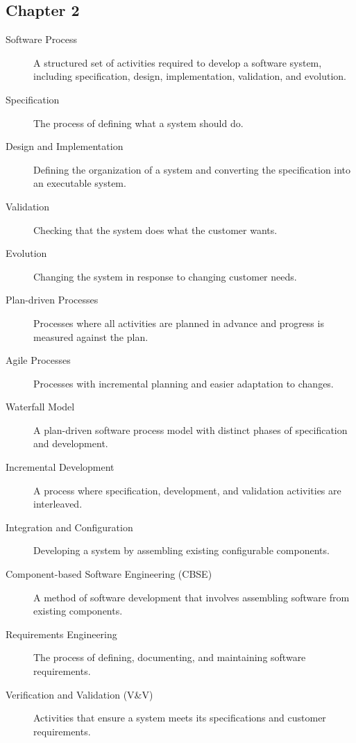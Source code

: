 \documentclass{article}
\begin{document}
\subsection{Chapter 2 }
\begin{description}
  \item[Software Process] A structured set of activities required to develop a software system, including specification, design, implementation, validation, and evolution.
  
  \item[Specification] The process of defining what a system should do.
  
  \item[Design and Implementation] Defining the organization of a system and converting the specification into an executable system.
  
  \item[Validation] Checking that the system does what the customer wants.
  
  \item[Evolution] Changing the system in response to changing customer needs.
  
  \item[Plan-driven Processes] Processes where all activities are planned in advance and progress is measured against the plan.
  
  \item[Agile Processes] Processes with incremental planning and easier adaptation to changes.
  
  \item[Waterfall Model] A plan-driven software process model with distinct phases of specification and development.
  
  \item[Incremental Development] A process where specification, development, and validation activities are interleaved.
  
  \item[Integration and Configuration] Developing a system by assembling existing configurable components.
  
  \item[Component-based Software Engineering (CBSE)] A method of software development that involves assembling software from existing components.
  
  \item[Requirements Engineering] The process of defining, documenting, and maintaining software requirements.
  
  \item[Verification and Validation (V\&V)] Activities that ensure a system meets its specifications and customer requirements.
  

\end{description}
\end{document}
